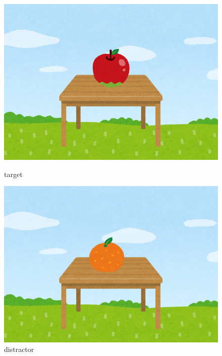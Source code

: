 \documentclass[a4paper,11pt]{jreport}
\begin{document}
\begin{figure}[H]
  \centering
  \begin{minipage}{0.23\textwidth}
    \centering
    \includegraphics[width=\linewidth]{figures/label_image1.png}
    \caption{target}
    \label{fig:image_1}
  \end{minipage}
  \hfill
  \begin{minipage}{0.23\textwidth}
    \centering
    \includegraphics[width=\linewidth]{figures/label_image2.png}
    \caption{distractor}
    \label{fig:image_2}
  \end{minipage}
  \hfill
  \begin{minipage}{0.23\textwidth}
    \centering

\end{minipage}
\end{figure}
\end{document}
